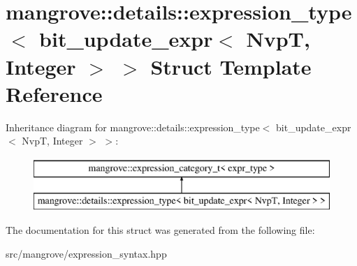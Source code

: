 \hypertarget{structmangrove_1_1details_1_1expression__type_3_01bit__update__expr_3_01NvpT_00_01Integer_01_4_01_4}{}\section{mangrove\+:\+:details\+:\+:expression\+\_\+type$<$ bit\+\_\+update\+\_\+expr$<$ NvpT, Integer $>$ $>$ Struct Template Reference}
\label{structmangrove_1_1details_1_1expression__type_3_01bit__update__expr_3_01NvpT_00_01Integer_01_4_01_4}
Inheritance diagram for mangrove\+:\+:details\+:\+:expression\+\_\+type$<$ bit\+\_\+update\+\_\+expr$<$ NvpT, Integer $>$ $>$\+:\begin{figure}[H]
\begin{center}
\leavevmode
\includegraphics[height=2.000000cm]{structmangrove_1_1details_1_1expression__type_3_01bit__update__expr_3_01NvpT_00_01Integer_01_4_01_4}
\end{center}
\end{figure}


The documentation for this struct was generated from the following file\+:\begin{DoxyCompactItemize}
\item 
src/mangrove/expression\+\_\+syntax.\+hpp\end{DoxyCompactItemize}
